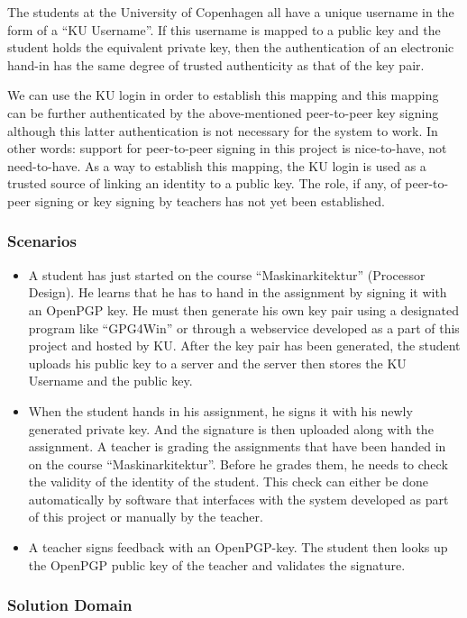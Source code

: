 \documentclass[11pt,a4paper]{report}
\begin{document}
The students at the University of Copenhagen all have a unique username in the form of a ``KU Username''. If this username is mapped to a public key and the student holds the equivalent private key, then the authentication of an electronic hand-in has the same degree of trusted authenticity as that of the key pair.

We can use the KU login in order to establish this mapping and this mapping can be further authenticated by the above-mentioned peer-to-peer key signing although this latter authentication is not necessary for the system to work. In other words: support for peer-to-peer signing in this project is nice-to-have, not need-to-have. As a way to establish this mapping, the KU login is used as a trusted source of linking an identity to a public key. The role, if any, of peer-to-peer signing or key signing by teachers has not yet been established.


\subsubsection{Scenarios}\label{Scenarios}
\begin{itemize}
\item A student has just started on the course ``Maskinarkitektur'' (Processor Design). He learns that he has to hand in the assignment by signing it with an OpenPGP key. He must then generate his own key pair using a designated program like ``GPG4Win'' or through a webservice developed as a part of this project and hosted by KU. After the key pair has been generated, the student uploads his public key to a server and the server then stores the KU Username and the public key.
\item When the student hands in his assignment, he signs it with his newly generated private key. And the signature is then uploaded along with the assignment. A teacher is grading the assignments that have been handed in on the course ``Maskinarkitektur''. Before he grades them, he needs to check the validity of the identity of the student. This check can either be done automatically by software that interfaces with the system developed as part of this project or manually by the teacher.
\item A teacher signs feedback with an OpenPGP-key. The student then looks up the OpenPGP public key of the teacher and validates the signature.
\end{itemize}

\subsubsection{Solution Domain}\label{Solution_Domain}
\end{document}
